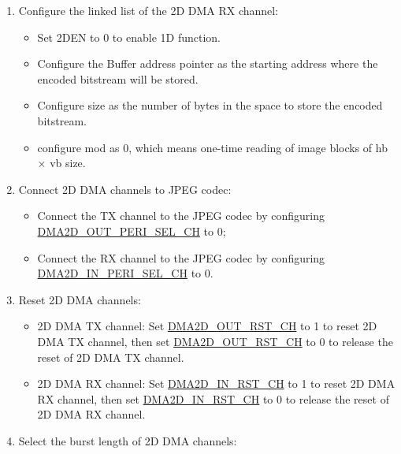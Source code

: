 \documentclass[main\_\_EN.tex]{subfiles}
\begin{document}
\begin{enumerate}
\begin{enumerate}
\begin{itemize}
{\begin{longtable}{ | L{4cm} | L{4cm} | l | l |}
                    \end{longtable}
                }
        \end{itemize}
        \item Configure the linked list of the 2D DMA RX channel:
        \begin{itemize}
            \item Set 2DEN to 0 to enable 1D function.
            \item Configure the Buffer address pointer as the starting address where the encoded bitstream will be stored.
            \item Configure size as the number of bytes in the space to store the encoded bitstream.
            \item configure mod as 0, which means one-time reading of image blocks of hb × vb size.
        \end{itemize}
        \item Connect 2D DMA channels to JPEG codec:
        \begin{itemize}
            \item Connect the TX channel to the JPEG codec by configuring \hyperref[fielddesc:DMA2DOUTPERISELCHN]{DMA2D\_OUT\_PERI\_SEL\_CH} to 0;
            \item Connect the RX channel to the JPEG codec by configuring \hyperref[fielddesc:DMA2DINPERISELCHN]{DMA2D\_IN\_PERI\_SEL\_CH} to 0.
        \end{itemize}
        \item Reset 2D DMA channels:
        \begin{itemize}
            \item 2D DMA TX channel: Set \hyperref[fielddesc:DMA2DOUTRSTCHN]{DMA2D\_OUT\_RST\_CH} to 1 to reset 2D DMA TX channel, then set \hyperref[fielddesc:DMA2DOUTRSTCHN]{DMA2D\_OUT\_RST\_CH} to 0 to release the reset of 2D DMA TX channel.
            \item 2D DMA RX channel: Set \hyperref[fielddesc:DMA2DINRSTCHN]{DMA2D\_IN\_RST\_CH} to 1 to reset 2D DMA RX channel, then set \hyperref[fielddesc:DMA2DINRSTCHN]{DMA2D\_IN\_RST\_CH} to 0 to release the reset of 2D DMA RX channel.
        \end{itemize}
        \item Select the burst length of 2D DMA channels:
        \begin{itemize}

\end{itemize}
\end{enumerate}
\end{enumerate}
\end{document}

